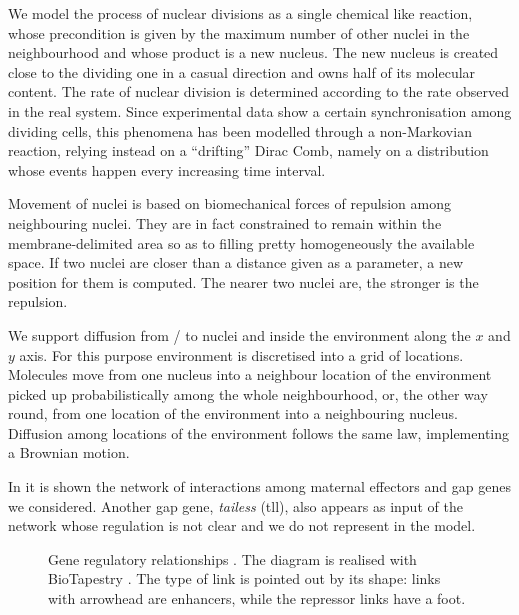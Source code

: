 \documentclass[12pt,a4paper,twoside,openright]{book}
\begin{document}
We model the process of nuclear divisions as a single chemical like reaction, whose precondition is given by the maximum number of other nuclei in the neighbourhood and whose product is a new nucleus. 
%
The new nucleus is created close to the dividing one in a casual direction and owns half of its molecular content.
%
The rate of nuclear division is determined according to the rate observed in the real system.
%
Since experimental data show a certain synchronisation among dividing cells, this phenomena has been modelled through a non-Markovian reaction, relying instead on a ``drifting'' Dirac Comb, namely on a distribution whose events happen every increasing time interval.

Movement of nuclei is based on biomechanical forces of repulsion among neighbouring nuclei. They are in fact constrained to remain within the membrane-delimited area so as to filling pretty homogeneously the available space.
%
If two nuclei are closer than a distance given as a parameter, a new position for them is computed. The nearer two nuclei are, the stronger is the repulsion.

We support diffusion from / to nuclei and inside the environment along the $x$ and $y$ axis.
%
For this purpose environment is discretised into a grid of locations.
%
Molecules move from one nucleus into a neighbour location of the environment picked up probabilistically among the whole neighbourhood, or, the other way round, from one location of the environment into a neighbouring nucleus.
%
Diffusion among locations of the environment follows the same law, implementing a Brownian motion.

In  it is shown the network of interactions among maternal effectors and gap genes we considered.
%
Another gap gene, \emph{tailess} (tll), also appears as input of the network whose regulation is not clear \cite{perkins-compbio06} and we do not represent in the model.

\begin{figure}
\caption[Gene regulatory relationships]{Gene regulatory relationships \cite{perkins-compbio06,RiveraPomar,gursky04}. The diagram is realised with BioTapestry \cite{biotapestry-2009}. The type of link is pointed out by its shape: links with arrowhead are enhancers, while the repressor links have a foot.}
\label{fig:genenetwork}
\end{figure}
\end{document}
